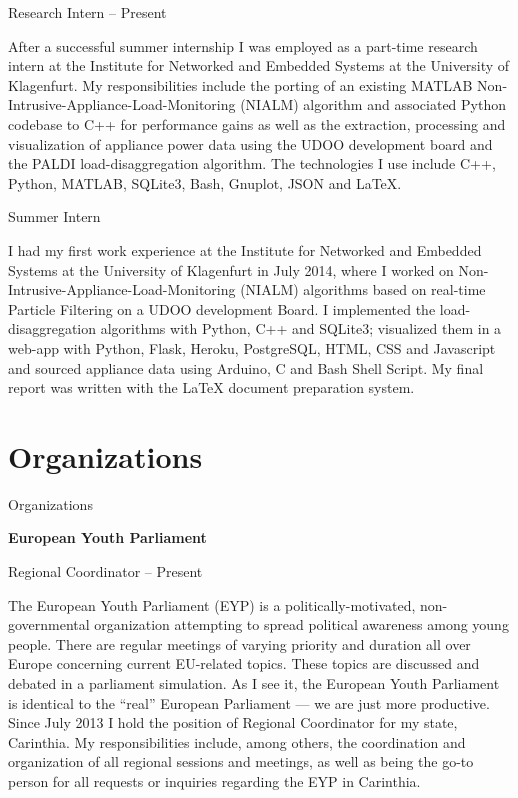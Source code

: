 \begin{body}
Research Intern
\hfill {} -- Present

\begin{detail}
After a successful summer internship I was employed as a part-time research intern at the Institute for Networked and Embedded Systems at the University of Klagenfurt. My responsibilities include the porting of an existing MATLAB Non-Intrusive-Appliance-Load-Monitoring (NIALM) algorithm and associated Python codebase to C++ for performance gains as well as the extraction, processing and visualization of appliance power data using the UDOO development board and the PALDI load-disaggregation algorithm. The technologies I use include C++, Python, MATLAB, SQLite3, Bash, Gnuplot, JSON and \LaTeX{}.
\end{detail}

Summer Intern
\hfill {}

\begin{detail}
I had my first work experience at the Institute for Networked and Embedded Systems at the University of Klagenfurt in July 2014, where I worked on Non-Intrusive-Appliance-Load-Monitoring (NIALM) algorithms based on real-time Particle Filtering on a UDOO development Board. I implemented the load-disaggregation algorithms with Python, C++ and SQLite3; visualized them in a web-app with Python, Flask, Heroku, PostgreSQL, HTML, CSS and Javascript and sourced appliance data using Arduino, C and Bash Shell Script. My final report was written with the \LaTeX{} document preparation system.
\end{detail}


\section{Organizations}
{Organizations}

\textbf{European Youth Parliament}

Regional Coordinator
\hfill {} -- Present

\begin{detail}
The European Youth Parliament (EYP) is a politically-motivated, non-governmental organization attempting to spread political awareness among young people. There are regular meetings of varying priority and duration all over Europe concerning current EU-related topics. These topics are discussed and debated in a parliament simulation. As I see it, the European Youth Parliament is identical to the ``real'' European Parliament --- we are just more productive. Since July 2013 I hold the position of Regional Coordinator for my state, Carinthia. My responsibilities include, among others, the coordination and organization of all regional sessions and meetings, as well as being the go-to person for all requests or inquiries regarding the EYP in Carinthia.
\end{detail}


\end{body}
